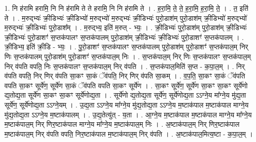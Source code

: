 \documentclass[17pt]{extarticle}
\begin{document}
1. नि ह॑रामि हरामि॒ नि नि ह॑रामि ते ते हरामि॒ नि नि ह॑रामि ते । . ह॒रा॒मि॒ ते॒ ते॒ ह॒रा॒मि॒ ह॒रा॒मि॒ ते॒ । . त॒ इति॑ ते । . म॒रुद्भ्यः॑ क्री॒डिभ्यः॑ क्री॒डिभ्यो॑ म॒रुद्भ्यो॑ म॒रुद्भ्यः॑ क्री॒डिभ्यः॑ पुरो॒डाश॑म् पुरो॒डाश॑म् क्री॒डिभ्यो॑ म॒रुद्भ्यो॑ म॒रुद्भ्यः॑ क्री॒डिभ्यः॑ पुरो॒डाश᳚म् । . म॒रुद्भ्य॒ इति॑ म॒रुत् - भ्यः॒ । . क्री॒डिभ्यः॑ पुरो॒डाश॑म् पुरो॒डाश॑म् क्री॒डिभ्यः॑ क्री॒डिभ्यः॑ पुरो॒डाशꣳ॑ स॒प्तक॑पालꣳ स॒प्तक॑पालम् पुरो॒डाश॑म् क्री॒डिभ्यः॑ क्री॒डिभ्यः॑ पुरो॒डाशꣳ॑ स॒प्तक॑पालम् । . क्री॒डिभ्य॒ इति॑ क्री॒डि - भ्यः॒ । . पु॒रो॒डाशꣳ॑ स॒प्तक॑पालꣳ स॒प्तक॑पालम् पुरो॒डाश॑म् पुरो॒डाशꣳ॑ स॒प्तक॑पाल॒म् निर् णिः स॒प्तक॑पालम् पुरो॒डाश॑म् पुरो॒डाशꣳ॑ स॒प्तक॑पाल॒म् निः । . स॒प्तक॑पाल॒म् निर् णिः स॒प्तक॑पालꣳ स॒प्तक॑पाल॒म् निर् व॑पति वपति॒ निः स॒प्तक॑पालꣳ स॒प्तक॑पाल॒म् निर् व॑पति । . स॒प्तक॑पाल॒मिति॑ स॒प्त - क॒पा॒ल॒म् । . निर् व॑पति वपति॒ निर् णिर् व॑पति सा॒कꣳ सा॒कं ॅव॑पति॒ निर् णिर् व॑पति सा॒कम् । . व॒प॒ति॒ सा॒कꣳ सा॒कं ॅव॑पति वपति सा॒कꣳ सूर्ये॑ण॒ सूर्ये॑ण सा॒कं ॅव॑पति वपति सा॒कꣳ सूर्ये॑ण । . सा॒कꣳ सूर्ये॑ण॒ सूर्ये॑ण सा॒कꣳ सा॒कꣳ सूर्ये॑णो द्य॒तोद्य॒ता सूर्ये॑ण सा॒कꣳ सा॒कꣳ सूर्ये॑णोद्य॒ता । . सूर्ये॑णो द्य॒तोद्य॒ता सूर्ये॑ण॒ सूर्ये॑णोद्य॒ता ऽऽग्ने॒य मा᳚ग्ने॒य मु॑द्य॒ता सूर्ये॑ण॒ सूर्ये॑णोद्य॒ता ऽऽग्ने॒यम् । . उ॒द्य॒ता ऽऽग्ने॒य मा᳚ग्ने॒य मु॑द्य॒तोद्य॒ता ऽऽग्ने॒य म॒ष्टाक॑पाल म॒ष्टाक॑पाल माग्ने॒य मु॑द्य॒तोद्य॒ता ऽऽग्ने॒य म॒ष्टाक॑पालम् । . उ॒द्य॒तेत्यु॑त् - य॒ता । . आ॒ग्ने॒य म॒ष्टाक॑पाल म॒ष्टाक॑पाल माग्ने॒य मा᳚ग्ने॒य म॒ष्टाक॑पाल॒म् निर् णिर॒ष्टाक॑पाल माग्ने॒य मा᳚ग्ने॒य म॒ष्टाक॑पाल॒म् निः । . अ॒ष्टाक॑पाल॒म् निर् णिर॒ष्टाक॑पाल म॒ष्टाक॑पाल॒म् निर् व॑पति वपति॒ निर॒ष्टाक॑पाल म॒ष्टाक॑पाल॒म् निर् व॑पति । . अ॒ष्टाक॑पाल॒मित्य॒ष्टा - क॒पा॒ल॒म् । \newline
\end{document}
